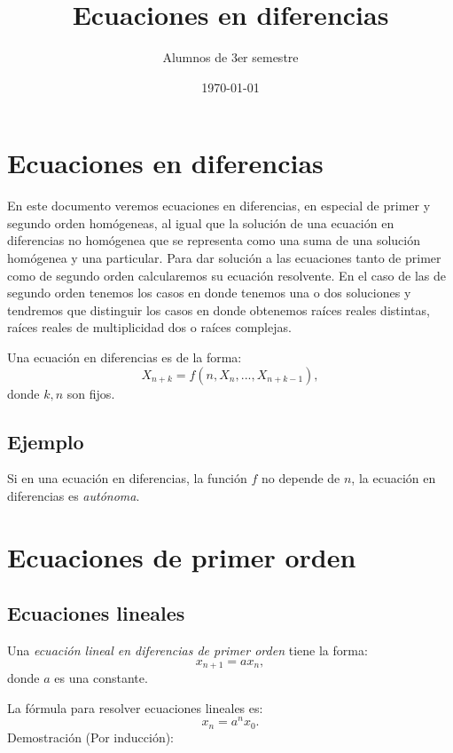 \documentclass{report}
\title{Ecuaciones en diferencias}
\author{Alumnos de 3er semestre}
\date{\today}
\begin{document}
\maketitle
\tableofcontents

\chapter{Ecuaciones en diferencias}
\label{sec:ecuaciones}

En este documento veremos ecuaciones en diferencias, en especial de
primer y segundo orden homógeneas, al igual que la solución de una
ecuación en diferencias no homógenea que se representa como una suma
de una solución homógenea y una particular. Para dar solución a las
ecuaciones tanto de primer como de segundo orden calcularemos su
ecuación resolvente.
En el caso de las de segundo orden tenemos los casos en donde tenemos una o dos soluciones y tendremos que distinguir los casos en donde obtenemos raíces reales distintas, raíces reales de multiplicidad dos o raíces complejas.

Una ecuación en diferencias es de la forma:
$$X_{n+k}=f(n,X_n,...,X_{n+k-1}),$$
donde $k,n$ son fijos.
\section{Ejemplo}

Si en una ecuación en diferencias, la función $f$ no depende de $n$,
la ecuación en diferencias es \emph{autónoma}.

\chapter{Ecuaciones de primer orden}

\section{Ecuaciones lineales}

Una \emph{ecuación lineal en diferencias de primer orden} tiene la forma:
\begin{equation}
  \label{lineal}
  x_{n+1}=ax_n,
\end{equation}
donde $a$ es una constante.

La fórmula para resolver ecuaciones lineales es:
\begin{equation}
  \label{lineal}
  x_n=a^nx_0.
\end{equation}
Demostración (Por inducción):
\end{document}
